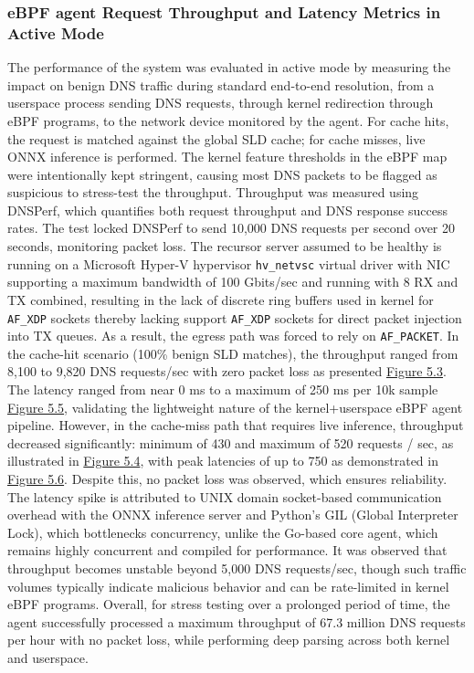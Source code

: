 \documentclass [11pt, proquest] {uwthesis}[2020/02/24]
\begin{document}
\subsubsection{eBPF agent Request Throughput and Latency Metrics in Active Mode}
The performance of the system was evaluated in active mode by measuring the impact on benign DNS traffic during standard end-to-end resolution, from a userspace process sending DNS requests, through kernel redirection through eBPF programs, to the network device monitored by the agent. For cache hits, the request is matched against the global SLD cache; for cache misses, live ONNX inference is performed. The kernel feature thresholds in the eBPF map were intentionally kept stringent, causing most DNS packets to be flagged as suspicious to stress-test the throughput. Throughput was measured using DNSPerf, which quantifies both request throughput and DNS response success rates. The test locked DNSPerf to send 10,000 DNS requests per second over 20 seconds, monitoring packet loss. The recursor server assumed to be healthy is running on a Microsoft Hyper-V hypervisor \texttt{hv\_netvsc} virtual driver with NIC supporting a maximum bandwidth of 100 Gbits/sec and running with 8 RX and TX combined, resulting in the lack of discrete ring buffers used in kernel for \texttt{AF\_XDP} sockets thereby lacking support \texttt{AF\_XDP} sockets for direct packet injection into TX queues. As a result, the egress path was forced to rely on \texttt{AF\_PACKET}. In the cache-hit scenario (100\% benign SLD matches), the throughput ranged from 8,100 to 9,820 DNS requests/sec with zero packet loss as presented \hyperref[fig:throughput_gsld]{Figure 5.3}. The latency ranged from near 0 ms to a maximum of 250 ms per 10k sample \hyperlink{fig:latency_gsld}{Figure 5.5}, validating the lightweight nature of the kernel+userspace eBPF agent pipeline. However, in the cache-miss path that requires live inference, throughput decreased significantly: minimum of 430 and maximum of 520 requests / sec, as illustrated in \hyperref[fig:throughput_onnx]{Figure 5.4}, with peak latencies of up to 750 as demonstrated in \hyperref[fig:latency_onnx]{Figure 5.6}. Despite this, no packet loss was observed, which ensures reliability. The latency spike is attributed to UNIX domain socket-based communication overhead with the ONNX inference server and Python’s GIL (Global Interpreter Lock), which bottlenecks concurrency, unlike the Go-based core agent, which remains highly concurrent and compiled for performance.
It was observed that throughput becomes unstable beyond 5,000 DNS requests/sec, though such traffic volumes typically indicate malicious behavior and can be rate-limited in kernel eBPF programs. Overall, for stress testing over a prolonged period of time, the agent successfully processed a maximum throughput of 67.3 million DNS requests per hour with no packet loss, while performing deep parsing across both kernel and userspace.
\end{document}
